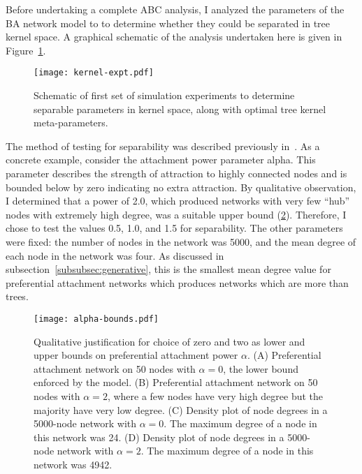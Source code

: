 Before undertaking a complete ABC analysis, I analyzed the parameters of the
\gls{BA} network model to to determine whether they could be separated in tree
kernel space. A graphical schematic of the analysis undertaken here is given in
Figure~\ref{fig:kernelexpt}.

\begin{figure}[ht]
  \centering
  \label{fig:kernelexpt}
  \texttt{[image: kernel-expt.pdf]}
  \caption[Schematic of first set of simulation experiments]{
    Schematic of first set of simulation experiments to determine separable
    parameters in kernel space, along with optimal tree kernel meta-parameters.
  }
\end{figure}

The method of testing for separability was described previously
in~\autocite{poon2015phylodynamic}. As a concrete example, consider the
attachment power parameter \gls{alpha}. This parameter describes the strength
of attraction to highly connected nodes and is bounded below by zero indicating
no extra attraction. By qualitative observation, I determined that a power of
2.0, which produced networks with very few ``hub'' nodes with extremely high
degree, was a suitable upper bound (\cref{fig:alphabds}). Therefore,
I chose to test the values 0.5, 1.0, and 1.5 for separability. The other
parameters were fixed: the number of nodes in the network was 5000, and the
mean degree of each node in the network was four. As discussed in
subsection~\ref{subsubsec:generative}, this is the smallest mean degree value
for preferential attachment networks which produces networks which are more
than trees. 

\begin{figure}[ht]
  \centering
  \texttt{[image: alpha-bounds.pdf]}
  \caption[Upper and lower bounds on preferential attachment power]{
    Qualitative justification for choice of zero and two as lower and upper
    bounds on preferential attachment power $\alpha$. (A) Preferential
    attachment network on 50 nodes with $\alpha = 0$, the lower bound enforced
    by the model. (B) Preferential attachment network on 50 nodes with $\alpha
    = 2$, where a few nodes have very high degree but the majority have very
    low degree. (C) Density plot of node degrees in a 5000-node network with
    $\alpha = 0$. The maximum degree of a node in this network was 24. (D)
    Density plot of node degrees in a 5000-node network with $\alpha = 2$. The
    maximum degree of a node in this network was 4942. 
  }
  \label{fig:alphabds}
\end{figure}

